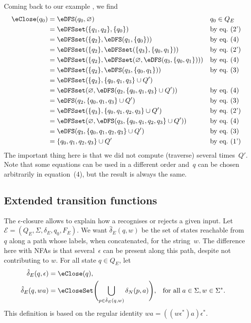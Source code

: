 Coming back to our example , we find
\begin{align*}
   \eClose (q_0)
&= \eDFS (q_0, \varnothing)
&& q_0 \in Q_E\\
&= \eDFSset (\{q_1, q_2\}, \{q_0\})
&& \text{by eq.~(2')}\\
&= \eDFSset (\{q_2\}, \eDFS (q_1, \{q_0\}))
&& \text{by eq.~(4)}\\
&= \eDFSset (\{q_2\}, \eDFSset (\{q_3\}, \{q_0,
   q_1\}))
&& \text{by eq.~(2')}\\
&= \eDFSset (\{q_2\}, \eDFSset (\varnothing, \eDFS (q_3, \{q_0, q_1\})))
&& \text{by eq.~(4)}\\
&= \eDFSset (\{q_2\}, \eDFS (q_3, \{q_0, q_1\}))
&& \text{by eq.~(3)}\\
&= \eDFSset (\{q_2\}, \{q_0, q_1, q_3\} \cup Q')\\
&= \eDFSset (\varnothing, \eDFS (q_2, \{q_0, q_1, q_3\} \cup Q'))
&& \text{by eq.~(4)}\\
&= \eDFS (q_2, \{q_0, q_1, q_3\} \cup Q')
&& \text{by eq.~(3)}\\
&= \eDFSset (\{q_3\}, \{q_0, q_1, q_2, q_3\} \cup Q')
&& \text{by eq.~(2')}\\
&= \eDFSset (\varnothing, \eDFS (q_3, \{q_0, q_1, q_2, q_3\} \cup Q'))
&& \text{by eq.~(4)}\\
&= \eDFS (q_3, \{q_0, q_1, q_2, q_3\} \cup Q')
&& \text{by eq.~(3)}\\
&= \{q_0, q_1, q_2, q_3\} \cup Q'
&& \text{by eq.~(1')}\\
\end{align*}
The important thing here is that we did not compute (traverse) several
times~\(Q'\). Note that some equations can be used in a different
order and~\(q\) can be chosen arbitrarily in equation~(4), but the
result is always the same.

\subsection*{Extended transition functions}

The \(\epsilon\)-closure allows to explain how a \eNFA recognises or
rejects a given input. Let \(\mathcal{E} = (Q_E, \Sigma, \delta_E,
q_0, F_E)\). We want \(\hat{\delta}_E (q, w)\) be the set of states
reachable from~\(q\) along a path whose labels, when concatenated, for
the string~\(w\). The difference here with NFAs is that
several~\(\epsilon\) can be present along this path, despite not
contributing to \(w\).  For all state \(q \in Q_E\), let
\begin{align*}
   \hat{\delta}_E (q, \epsilon)
&= \eClose (q),\\
   \hat{\delta}_E (q, wa)
&= \eCloseSet \Biggl(\bigcup_{p \in \hat{\delta}_E (q, w)}{\delta_N (p,
     a)}\Biggr),
&& \text{for all} \; a \in \Sigma, w \in \Sigma^{*}.
\end{align*}
This definition is based on the regular identity \(wa =
((w\epsilon^{*})a)\epsilon^{*}\).

